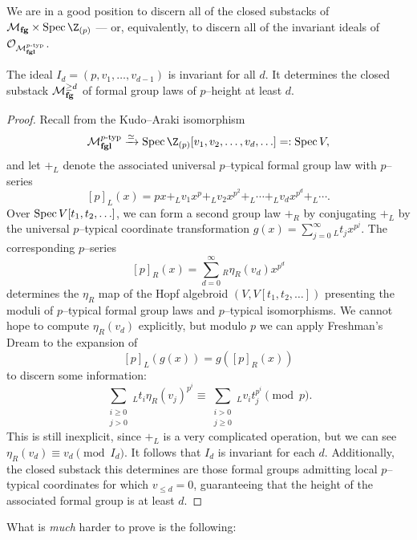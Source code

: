 We are in a good position to discern all of the closed substacks of $\moduli{fg} \times \Spec \Z_{(p)}$ --- or, equivalently, to discern all of the invariant ideals of $\mathcal{O}_{\mathcal{M}_{\mathbf{fgl}}^{p\text{-}\mathrm{typ}}}$.

\begin{corollary}
The ideal $I_d = (p, v_1, \ldots, v_{d-1})$ is invariant for all $d$.  It determines the closed substack $\mathcal{M}_{\mathbf{fg}}^{\ge d}$ of formal group laws of $p$--height at least $d$.
\end{corollary}
\begin{proof}
Recall from  the Kudo--Araki isomorphism \[\moduli{fgl}^{\ptyp} \xrightarrow{\simeq} \Spec \Z_{(p)}[v_1, v_2, \ldots, v_d, \ldots] =: \Spec V,\] and let $+_L$ denote the associated universal $p$--typical formal group law with $p$--series \[[p]_L(x) = px +_L v_1 x^p +_L v_2 x^{p^2} +_L \cdots +_L v_d x^{p^d} +_L \cdots.\]  Over $\operatorname{Spec} V[t_1, t_2, \ldots]$, we can form a second group law $+_R$ by conjugating $+_L$ by the universal $p$--typical coordinate transformation $g(x) = \sum_{j=0}^\infty {}_L t_j x^{p^j}$.  The corresponding $p$--series \[[p]_R(x) = \sum_{d=0}^\infty {}_R \eta_R(v_d) x^{p^d}\] determines the $\eta_R$ map of the Hopf algebroid $(V, V[t_1, t_2, \ldots])$ presenting the moduli of $p$--typical formal group laws and $p$--typical isomorphisms.  We cannot hope to compute $\eta_R(v_d)$ explicitly, but modulo $p$ we can apply Freshman's Dream to the expansion of \[[p]_L(g(x)) = g([p]_R(x))\] to discern some information: \[\sum_{\substack{i \ge 0 \\ j > 0}}{}_L t_i \eta_R(v_j)^{p^i} \equiv \sum_{\substack{i > 0 \\ j \ge 0}}{}_L v_i t_j^{p^i} \pmod p.\]  This is still inexplicit, since $+_L$ is a very complicated operation, but we can see $\eta_R(v_d) \equiv v_d \pmod{I_d}$.  It follows that $I_d$ is invariant for each $d$.  Additionally, the closed substack this determines are those formal groups admitting local $p$--typical coordinates for which $v_{\le d} = 0$, guaranteeing that the height of the associated formal group is at least $d$.
\end{proof}

\noindent What is \emph{much} harder to prove is the following:

